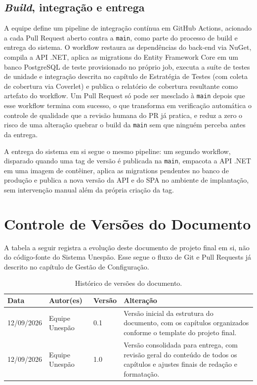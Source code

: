 \documentclass[a4paper,12pt,oneside,openany]{book}
\begin{document}
\section{\textit{Build}, integração e entrega}

A equipe define um pipeline de integração contínua em GitHub Actions, acionado a cada Pull Request aberto contra a \texttt{main}, como parte do processo de build e entrega do sistema. O workflow restaura as dependências do back-end via NuGet, compila a API .NET, aplica as migrations do Entity Framework Core em um banco PostgreSQL de teste provisionado no próprio job, executa a suíte de testes de unidade e integração descrita no capítulo de Estratégia de Testes (com coleta de cobertura via Coverlet) e publica o relatório de cobertura resultante como artefato do workflow. Um Pull Request só pode ser mesclado à \texttt{main} depois que esse workflow termina com sucesso, o que transforma em verificação automática o controle de qualidade que a revisão humana do PR já pratica, e reduz a zero o risco de uma alteração quebrar o build da \texttt{main} sem que ninguém perceba antes da entrega.

A entrega do sistema em si segue o mesmo pipeline: um segundo workflow, disparado quando uma tag de versão é publicada na \texttt{main}, empacota a API .NET em uma imagem de contêiner, aplica as migrations pendentes no banco de produção e publica a nova versão da API e do SPA no ambiente de implantação, sem intervenção manual além da própria criação da tag.

\chapter*{Controle de Versões do Documento}

A tabela a seguir registra a evolução deste documento de projeto final em si, não do código-fonte do Sistema Unespão. Esse segue o fluxo de Git e Pull Requests já descrito no capítulo de Gestão de Configuração.

\begin{table}[H]
\centering
\caption{Histórico de versões do documento.}
\begin{tabularx}{0.95\textwidth}{p{} p{} p{} X}
\toprule
\textbf{Data} & \textbf{Autor(es)} & \textbf{Versão} & \textbf{Alteração} \\
\midrule
12/09/2026 & Equipe Unespão & 0.1 & Versão inicial da estrutura do documento, com os capítulos organizados conforme o template do projeto final. \\
12/09/2026 & Equipe Unespão & 1.0 & Versão consolidada para entrega, com revisão geral do conteúdo de todos os capítulos e ajustes finais de redação e formatação. \\
\bottomrule
\end{tabularx}
\end{table}
\end{document}
